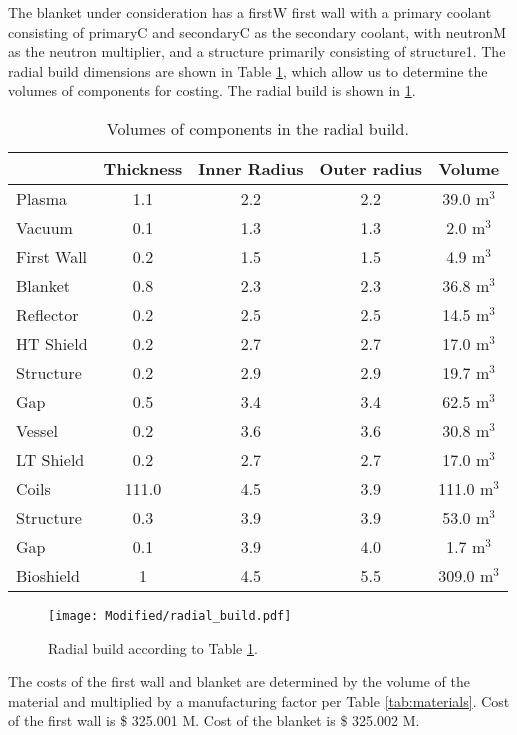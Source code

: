 The blanket under consideration has a firstW first wall with a primary coolant consisting of primaryC and secondaryC as the secondary coolant, with neutronM as the neutron multiplier, and a structure primarily consisting of structure1. The radial build dimensions are shown in Table \ref{tab:volumes}, which allow us to determine the volumes of components for costing.  The radial build is shown in \ref{fig:radial}.  \\


\begin{table}[h!]
    \centering
    \begin{tabular}{l c  c c c}
    \hline
        &	Thickness	&	Inner Radius	&	Outer radius	&	Volume		\\
        \hline
Plasma	&	1.1	&	2.2	&	2.2	&	39.0	m$^{3}$	\\
Vacuum	&	0.1	&	1.3	&	1.3	&	2.0	m$^{3}$	\\
First Wall	&	0.2	&	1.5	&	1.5	&	4.9	m$^{3}$	\\
Blanket	&	0.8	&	2.3	&	2.3	&	36.8	m$^{3}$	\\
Reflector	&	0.2	&	2.5	&	2.5	&	14.5	m$^{3}$	\\
HT Shield	&	0.2	&	2.7	&	2.7	&	17.0	m$^{3}$	\\
Structure	&	0.2	&	2.9	&	2.9	&	19.7	m$^{3}$	\\
Gap	&	0.5	&	3.4	&	3.4	&	62.5	m$^{3}$	\\
Vessel	&	0.2	&	3.6	&	3.6	&	30.8	m$^{3}$	\\
LT Shield	&	0.2	&	2.7	&	2.7	&	17.0	m$^{3}$	\\
Coils	&	111.0	&	4.5	&	3.9	&	111.0	m$^{3}$	\\
Structure	&	0.3	&	3.9	&	3.9	&	53.0	m$^{3}$	\\
Gap	&	0.1	&	3.9	&	4.0	&	1.7	m$^{3}$	\\
Bioshield	&	1	&	4.5	&	5.5	&	309.0	m$^{3}$	\\

        \hline
    \end{tabular}
    \caption{Volumes of components in the radial build.}
    \label{tab:volumes}
\end{table}

\begin{figure}
    \centering
    \texttt{[image: Modified/radial\_build.pdf]}
    \caption{Radial build according to Table \ref{tab:volumes}.}
    \label{fig:radial}
\end{figure}



The costs of the first wall and blanket are determined by the volume of the material and multiplied by a manufacturing factor per Table \ref{tab:materials}.   Cost of the first wall is \$ 325.001 M.  Cost of the blanket is \$ 325.002 M.

